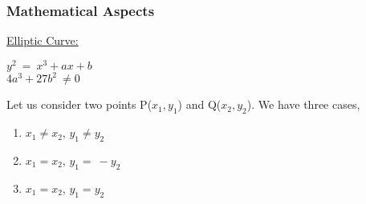 \documentclass[11pt]{article}
\begin{document}
\subsubsection{Mathematical Aspects}
\underline{Elliptic Curve:}\\
\begin{center}
    $y^2\ =\ x^3+ax+b$\\
    $4a^3+27b^2\ \neq 0$
\end{center}
Let us consider two points P($x_1, y_1$) and Q($x_2, y_2$). We have three cases,
\begin{enumerate}
    \item $x_1\neq x_2$, $y_1\neq y_2$
    \item $x_1= x_2$, $y_1=\  -y_2$
    \item $x_1= x_2$, $y_1= y_2$
    
\end{enumerate}
\end{document}
